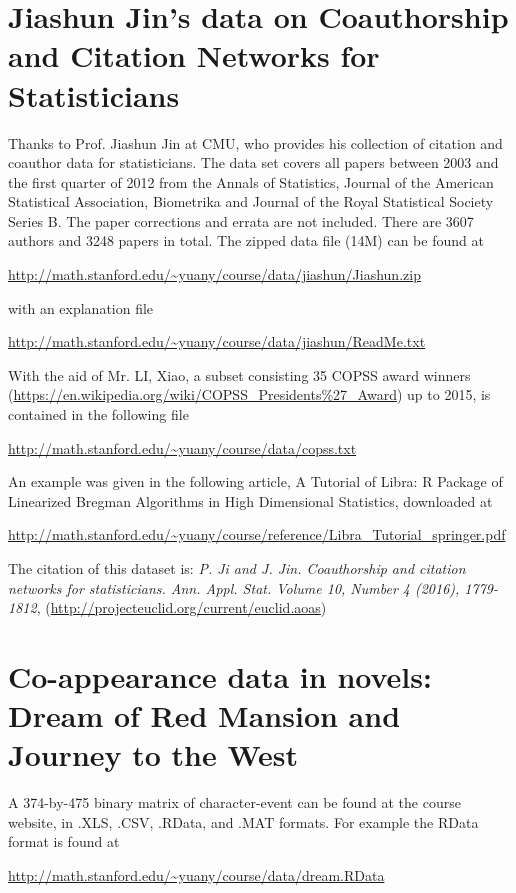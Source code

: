 \documentclass[11pt]{article}
\begin{document}
\section{Jiashun Jin's data on Coauthorship and Citation Networks for Statisticians}
Thanks to Prof. Jiashun Jin at CMU, who provides his collection of citation and coauthor data for statisticians. The data set covers all papers between 2003 and the first quarter of 2012 from the Annals of Statistics, Journal of the American Statistical Association, Biometrika and Journal of the Royal Statistical Society Series B. The paper corrections and errata are not included. There are 3607 authors and 3248 papers in total. The zipped data file (14M) can be found at 

\url{http://math.stanford.edu/~yuany/course/data/jiashun/Jiashun.zip}

\noindent with an explanation file

\url{http://math.stanford.edu/~yuany/course/data/jiashun/ReadMe.txt}

With the aid of Mr. LI, Xiao, a subset consisting 35 COPSS award winners (\url{https://en.wikipedia.org/wiki/COPSS_Presidents\%27_Award}) up to 2015, is contained in the following file

\url{http://math.stanford.edu/~yuany/course/data/copss.txt} 

\noindent An example was given in the following article, A Tutorial of Libra: R Package of Linearized Bregman Algorithms in High Dimensional Statistics, downloaded at

\url{http://math.stanford.edu/~yuany/course/reference/Libra_Tutorial_springer.pdf}

The citation of this dataset is: \emph{P. Ji and J. Jin. Coauthorship and citation networks for statisticians. Ann. Appl. Stat. Volume 10, Number 4 (2016), 1779-1812}, (\url{http://projecteuclid.org/current/euclid.aoas})




\section{Co-appearance data in novels: Dream of Red Mansion and Journey to the West}

A 374-by-475 binary matrix of character-event can be found at the course website, in .XLS, .CSV, .RData, and .MAT formats. For example the RData format is found at

\url{http://math.stanford.edu/~yuany/course/data/dream.RData} 
\end{document}
